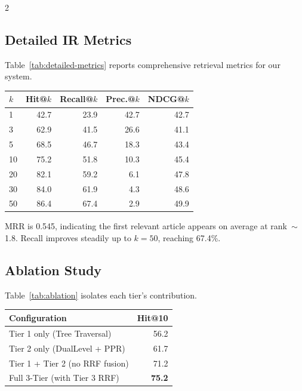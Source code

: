 \documentclass[11pt,a4paper]{article}
\begin{document}
\begin{multicols}{2}

\subsection{Detailed IR Metrics}

Table~\ref{tab:detailed-metrics} reports comprehensive retrieval metrics for our system.

\vspace{0.3em}
\noindent
\centering\small
{}
\label{tab:detailed-metrics}
\begin{tabular}{lrrrr}
\toprule
\textbf{$k$} & \textbf{Hit@$k$} & \textbf{Recall@$k$} & \textbf{Prec.@$k$} & \textbf{NDCG@$k$} \\
\midrule
1 & 42.7 & 23.9 & 42.7 & 42.7 \\
3 & 62.9 & 41.5 & 26.6 & 41.1 \\
5 & 68.5 & 46.7 & 18.3 & 43.4 \\
10 & 75.2 & 51.8 & 10.3 & 45.4 \\
20 & 82.1 & 59.2 & 6.1 & 47.8 \\
30 & 84.0 & 61.9 & 4.3 & 48.6 \\
50 & 86.4 & 67.4 & 2.9 & 49.9 \\
\bottomrule
\end{tabular}
\normalsize
\justifying
\vspace{0.3em}

MRR is 0.545, indicating the first relevant article appears on average at rank~$\sim$1.8. Recall improves steadily up to $k\!=\!50$, reaching 67.4\%.

\subsection{Ablation Study}

Table~\ref{tab:ablation} isolates each tier's contribution.

\vspace{0.3em}
\noindent
\centering\small
{}
\label{tab:ablation}
\begin{tabular}{lr}
\toprule
\textbf{Configuration} & \textbf{Hit@10} \\
\midrule
Tier 1 only (Tree Traversal) & 56.2 \\
Tier 2 only (DualLevel + PPR) & 61.7 \\
Tier 1 + Tier 2 (no RRF fusion) & 71.2 \\
Full 3-Tier (with Tier 3 RRF) & \textbf{75.2} \\
\bottomrule
\end{tabular}
\normalsize
\justifying
\vspace{0.3em}


\end{multicols}
\end{document}
